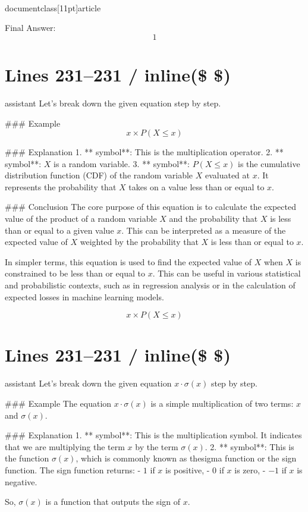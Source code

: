 \\documentclass[11pt]{article}
\begin{document}
Final Answer:
\[ \boxed{1} \]


\section*{Lines 231–231 / inline(\$ \$) }
assistant
Let's break down the given equation step by step.

### Example
\[ x \times P(X \le x) \]

### Explanation
1. ** symbol**: This is the multiplication operator.
2. ** symbol**: \( X \) is a random variable.
3. ** symbol**: \( P(X \le x) \) is the cumulative distribution function (CDF) of the random variable \( X \) evaluated at \( x \). It represents the probability that \( X \) takes on a value less than or equal to \( x \).

### Conclusion
The core purpose of this equation is to calculate the expected value of the product of a random variable \( X \) and the probability that \( X \) is less than or equal to a given value \( x \). This can be interpreted as a measure of the expected value of \( X \) weighted by the probability that \( X \) is less than or equal to \( x \).

In simpler terms, this equation is used to find the expected value of \( X \) when \( X \) is constrained to be less than or equal to \( x \). This can be useful in various statistical and probabilistic contexts, such as in regression analysis or in the calculation of expected losses in machine learning models.

\[
\boxed{x \times P(X \le x)}
\]


\section*{Lines 231–231 / inline(\$ \$) }
assistant
Let's break down the given equation \( x \cdot \sigma(x) \) step by step.

### Example
The equation \( x \cdot \sigma(x) \) is a simple multiplication of two terms: \( x \) and \( \sigma(x) \).

### Explanation
1. ** symbol**: This is the multiplication symbol. It indicates that we are multiplying the term \( x \) by the term \( \sigma(x) \).
2. ** symbol**: This is the function \( \sigma(x) \), which is commonly known as thesigma function or the sign function. The sign function returns:
   - \( 1 \) if \( x \) is positive,
   - \( 0 \) if \( x \) is zero,
   - \( -1 \) if \( x \) is negative.

So, \( \sigma(x) \) is a function that outputs the sign of \( x \).
\end{document}
